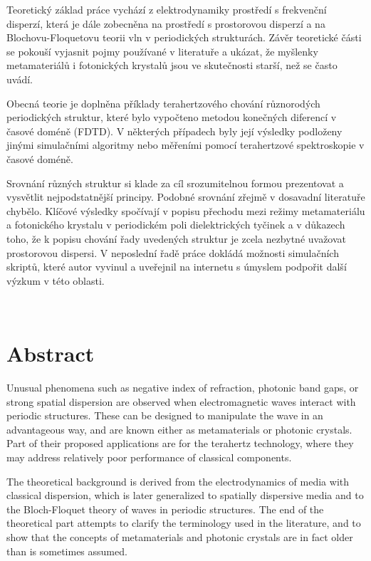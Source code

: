 Teoretický základ práce vychází z elektrodynamiky prostředí s frek\-ven\-ční dis\-per\-zí, která je dále zobecněna na prostředí s prostorovou disperzí a na Blochovu-Floquetovu teorii vln v periodických strukturách. Závěr teoretické části se pokouší vyjasnit pojmy používané v literatuře a ukázat, že myšlenky metamateriálů i fotonických krystalů jsou ve skutečnosti starší, než se často uvádí.

Obecná teorie je doplněna příklady terahertzového chování různorodých periodických struktur, které bylo vypočteno metodou konečných diferencí v časové doméně (FDTD). V některých případech byly její výsledky podloženy jinými simulačními algoritmy nebo měřeními pomocí terahertzové spektroskopie v časové doméně.

Srovnání  různých struktur si klade za cíl srozumitelnou formou prezentovat a vy\-svět\-lit nej\-pod\-stat\-něj\-ší principy. Podobné srov\-nání zřejmě v dosavadní literatuře chy\-bě\-lo. Klíčové vý\-sledky spočí\-vají v popisu přechodu mezi režimy metamateriálu a fotonického krystalu v periodickém poli dielektrických tyčinek a v důkazech toho, že k popisu chování řady uvedených struktur je zcela nezbytné uvažovat prostorovou dispersi. V neposlední řadě práce dokládá možnosti simulačních skriptů, které autor vyvinul a uveřejnil na internetu s úmyslem podpořit další výzkum v této oblasti. 

\vspace{0mm}

\thispagestyle{empty} \newpage ~ \thispagestyle{empty} \newpage \setcounter{page}{1}

{\let\clearpage\relax\chapter*{Abstract}}
\noindent
Unusual phenomena such as negative index of refraction, photonic band gaps, or strong spatial dispersion are observed when electromagnetic waves interact with periodic structures. These can be designed to manipulate the wave in an advantageous way, and are known either as metamaterials or photonic crystals. Part of their proposed applications are for the terahertz technology, where they may address relatively poor performance of classical components.

The theoretical background is derived from the electrodynamics of media with classical dispersion, which is later generalized to spatially dispersive media and to the Bloch-Floquet theory of waves in periodic structures. The end of the theoretical part attempts to clarify the terminology used in the literature, and to show that the concepts of metamaterials and photonic crystals are in fact older than is sometimes assumed.

